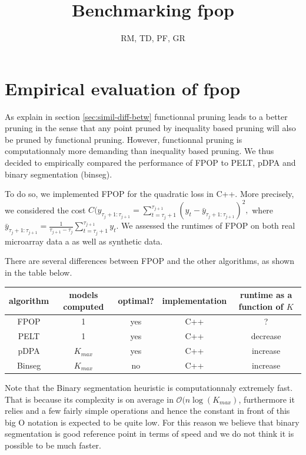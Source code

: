 \documentclass{article}
\begin{document}
\title{Benchmarking fpop}
\author{RM, TD, PF, GR}
\maketitle

\tableofcontents

\section{Empirical evaluation of fpop}

As explain in section \ref{sec:simil-diff-betw} functionnal pruning leads to a better pruning in the sense
that any point pruned by inequality based pruning will also be pruned by functional pruning.
However, functionnal pruning is computationnaly more demanding than inequality based pruning. 
We thus decided to empirically compared the performance of FPOP to PELT, pDPA and binary segmentation (binseg).

To do so, we implemented FPOP for the quadratic loss in C++.
More precisely, we considered the cost $C(y_{\tau_j+1:\tau_{j+1}} = \sum_{t=\tau_j+1}^{\tau_{j+1}} (y_t - \bar{y}_{\tau_j+1:\tau_{j+1}})^2,$ where
$ \bar{y}_{\tau_j+1:\tau_{j+1}} = \frac{1}{\tau_{j+1} - \tau_j} \sum_{t=\tau_j+1}^{\tau_{j+1}} y_t$.
We assessed the runtimes of FPOP on both real microarray data a as well as synthetic data.

There are several differences between FPOP and the other
algorithms, as shown in the table below.
\begin{center}
  \begin{tabular}{ccccc}
    algorithm & models computed & optimal? & implementation & runtime as a function of $K$\\
    \hline
    FPOP & 1 & yes & C++  &  ?                  \\
    PELT & 1 & yes & C++  &  decrease \\
    pDPA & $K_{max}$ & yes & C++ & increase \\
    Binseg & $K_{max}$ & no & C++ & increase
  \end{tabular}
\end{center}

Note that the Binary segmentation heuristic is computationnaly extremely fast. That is 
because its complexity is on average in $\mathcal{O}(n \log(K_{max})$, furthermore it 
relies and a few fairly simple operations and hence the constant in front of 
this big O notation is expected to be quite low.
For this reason we believe that binary segmentation is good reference point in terms 
of speed and we do not think it is possible to be much faster. 
\end{document}
